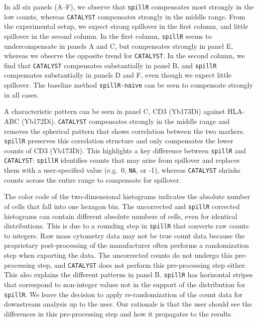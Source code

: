 \documentclass{bioinfo}
\begin{document}
In all six panels (A--F), we observe that \texttt{spillR} compensates
most strongly in the low counts, whereas \texttt{CATALYST} compensates
strongly in the middle range. From the experimental setup, we expect
strong spillover in the first column, and little spillover in the second
column. In the first column, \texttt{spillR} seems to undercompensate in
panels A and C, but compensates strongly in panel E, whereas we observe
the opposite trend for \texttt{CATALYST}. In the second column, we find
that \texttt{CATALYST} compensates substantially in panel B, and
\texttt{spillR} compensates substantially in panels D and F, even though
we expect little spillover. The baseline method \texttt{spillR-naive}
can be seen to compensate strongly in all cases.

A characteristic pattern can be seen in panel C, CD3 (Yb173Di) against
HLA-ABC (Yb172Di). \texttt{CATALYST} compensates strongly in the middle
range and removes the spherical pattern that shows correlation between
the two markers. \texttt{spillR} preserves this correlation structure
and only compensates the lower counts of CD3 (Yb173Di). This highlights
a key difference between \texttt{spillR} and \texttt{CATALYST}:
\texttt{spillR} identifies counts that may arise from spillover and
replaces them with a user-specified value (e.g.~0, \texttt{NA}, or -1),
whereas \texttt{CATALYST} shrinks counts across the entire range to
compensate for spillover.

The color code of the two-dimensional histograms indicates the absolute
number of cells that fall into one hexagon bin. The uncorrected and
\texttt{spillR} corrected histograms can contain different absolute
numbers of cells, even for identical distributions. This is due to a
rounding step in \texttt{spillR} that converts raw counts to integers.
Raw mass cytometry data may not be true count data because the
proprietary post-processing of the manufacturer often performs a
randomization step when exporting the data. The uncorrected counts do
not undergo this pre-processing step, and \texttt{CATALYST} does not
perform this pre-processing step either. This also explains the
different patterns in panel B. \texttt{spillR} has horizontal stripes
that correspond to non-integer values not in the support of the
distribution for \texttt{spillR}. We leave the decision to apply
re-randomization of the count data for downstream analysis up to the
user. Our rationale is that the user should see the differences in this
pre-processing step and how it propagates to the results.
\end{document}

